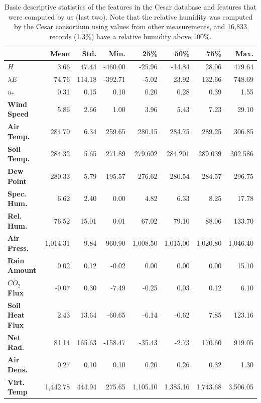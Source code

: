 \documentclass[a4paper]{book}
\begin{document}
\begin{table}[]
\centering
\caption{Basic descriptive statistics of the features in the Cesar database  and features that were computed by us (last two).  Note that the relative humidity was computed by the Cesar consortium using values from other measurements, and 16,833 records  (1.3\%) have a relative humidity above 100\%.}
\label{tbl:col_summary}
\begin{tabular*}{\textwidth}{l| @{\extracolsep{\fill}} rrrrrrr}
\toprule
& \textbf{Mean} & \textbf{Std.} & \textbf{Min.} & \textbf{25\%} & \textbf{50\%} & \textbf{75\%} & \textbf{Max.} \\ \midrule
\textbf{$H$} & 3.66 & 47.44 & -460.00 & -25.96 & -14.84 & 28.06 & 479.64 \\
\textbf{$\lambda E$} & 74.76 & 114.18 & -392.71 & -5.02& 23.92 & 132.66 & 748.69 \\
\textbf{$u_*$} & 0.31 & 0.15 & 0.10 & 0.20 & 0.28 & 0.39 & 1.55 \\
\textbf{Wind Speed} & 5.86 & 2.66 & 1.00 & 3.96 & 5.43 & 7.23 & 29.10 \\
\textbf{Air Temp.} & 284.70 & 6.34 & 259.65 & 280.15 & 284.75 & 289.25 & 306.85 \\
\textbf{Soil Temp.} & 284.32 & 5.65 & 271.89 & 279.602 & 284.201 & 289.039 & 302.586 \\
\textbf{Dew Point} & 280.33 & 5.79 & 195.57 & 276.62 & 280.54 & 284.57 & 296.75 \\
\textbf{Spec. Hum.} & 6.62 & 2.40 & 0.00 & 4.82 & 6.33 & 8.25 & 17.78 \\
\textbf{Rel. Hum.} & 76.52 & 15.01 & 0.01 & 67.02 & 79.10 & 88.06 & 133.70 \\
\textbf{Air Press.} & 1,014.31 & 9.84 & 960.90 & 1,008.50 & 1,015.00 & 1,020.80 & 1,046.40 \\
\textbf{Rain Amount} & 0.02 & 0.12 & -0.02 & 0.00 & 0.00 & 0.00 & 15.10 \\
\textbf{$CO_2$ Flux} & -0.07 & 0.30 & -7.49 & -0.25 & 0.03 & 0.12 & 6.10 \\
\textbf{Soil Heat Flux} & 2.43 & 13.64 & -60.65 & -6.14 & -0.62 & 7.85 & 123.16 \\
\textbf{Net Rad.} & 81.14 & 165.63 & -158.47 & -35.43 & -2.73 & 170.60 & 919.05 \\
\textbf{Air Dens.} & 0.27 & 0.10 & 0.10 & 0.20 & 0.26 & 0.32 & 1.30 \\
\textbf{Virt. Temp} & 1,442.78 & 444.94 & 275.65 & 1,105.10 & 1,385.16 & 1,743.68 & 3,506.05 \\
\bottomrule
\end{tabular*}
\end{table}
\end{document}
